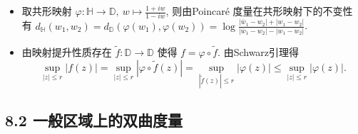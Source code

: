 \begin{itemize}
\item[8.1.3]取共形映射  $\varphi: \mathbb{H}\to \mathbb{D},
\ w\mapsto \frac{1+iw}{1-iw}$, 则由Poincar\'{e} 度量在共形映射下的不变性
有 $d_{\mathbb{H}}(w_1,w_2) = d_{\mathbb{D}}(\varphi(w_1),\varphi(w_2)) 
= \log \frac{|\bar{w}_1 - w_2|+|w_1-w_2|}{|\bar{w}_1 - w_2|-|w_1-w_2|}$. 
\item[8.1.4] 由映射提升性质存在 $\tilde{f}:\mathbb{D}\to \mathbb{D}$
使得  $f = \varphi\circ\tilde{f} $. 由Schwarz引理得
$$ \sup_{|z|\le r}|f(z)| = \sup_{|z|\le r}|\varphi\circ\tilde{f}(z)| 
= \sup_{|\tilde{f}(z)|\le r}|\varphi(z)|\le  \sup_{|z|\le r}|\varphi(z)|. $$
\end{itemize}

\subsection*{8.2 一般区域上的双曲度量}

